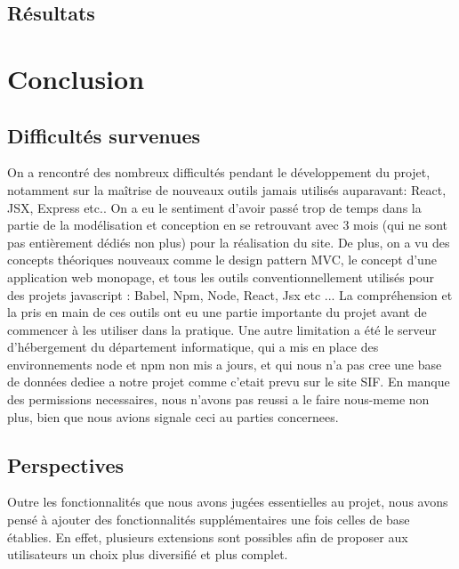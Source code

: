 \documentclass[a4paper,12pt]{report}
\theoremstyle{break}
\theoremstyle{break}
\theoremstyle{break}
\theoremstyle{break}
\theoremstyle{definition}
\theoremstyle{remark}
\begin{document}
\section{Résultats}
\chapter{Conclusion}
\section{Difficultés survenues}
On a rencontré des nombreux difficultés pendant le développement du projet, notamment sur la maîtrise de
nouveaux outils jamais utilisés auparavant: React, JSX, Express etc..
On a eu le sentiment d'avoir passé trop de temps dans la partie de la modélisation et conception en se retrouvant
avec 3 mois (qui ne sont pas entièrement dédiés non plus) pour la réalisation du site.
De plus, on a vu des concepts théoriques nouveaux comme le design pattern MVC, le concept d'une application web monopage,
et tous les outils conventionnellement utilisés pour des projets javascript : Babel, Npm, Node, React, Jsx etc ...
La compréhension et la pris en main de ces outils ont eu une partie importante du projet avant de commencer à les utiliser dans la pratique.
Une autre limitation a été le serveur d'hébergement du département informatique, qui a mis en place des environnements node et npm non mis a jours,
et qui nous n’a pas cree une base de données  dediee a notre projet comme c’etait prevu sur le site SIF. En manque des permissions necessaires, nous n’avons pas reussi a le faire nous-meme non plus, bien que nous avions signale ceci au parties concernees.


\section{Perspectives}
\label{sec:perspectives}
Outre les fonctionnalités que nous avons jugées essentielles au projet, nous avons pensé à ajouter des fonctionnalités supplémentaires une fois celles de base établies. En effet, plusieurs extensions sont possibles afin de proposer aux utilisateurs un choix plus diversifié et plus complet.
\end{document}
